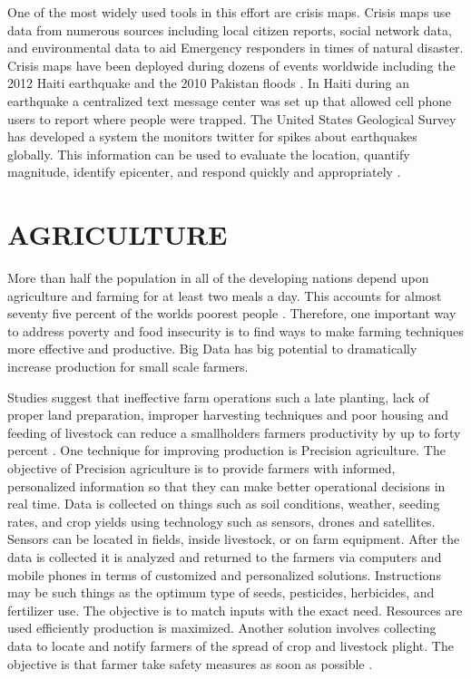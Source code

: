 \documentclass[sigconf]{acmart}
\begin{document}
One of the most widely used tools in this effort are crisis maps. Crisis maps use data from numerous sources including local citizen reports, social network data, and environmental data to aid Emergency responders in times of natural disaster. Crisis maps have been deployed during dozens of events worldwide including the 2012 Haiti earthquake and the 2010 Pakistan floods \cite{www-google-Hffpst}.
In Haiti during an earthquake a centralized text message center was set up that allowed cell phone users to report where people were trapped. The United States Geological Survey has developed a system the monitors twitter for spikes about earthquakes globally. This information can be used to evaluate the location, quantify magnitude, identify epicenter, and respond quickly and appropriately \cite{www-google-GloPls}.

\section{AGRICULTURE}

More than half the population in all of the developing nations depend upon agriculture and farming for at least two meals a day. This accounts for almost seventy five percent of the worlds poorest people \cite{www-google-top10}.  Therefore, one important way to address poverty and food insecurity is to find ways to make farming techniques more effective and productive. Big Data has big potential to dramatically increase production for small scale farmers.

Studies suggest that ineffective farm operations such a late planting, lack of proper land preparation, improper harvesting techniques and poor housing and feeding of livestock can reduce a smallholders farmers productivity by up to forty percent \cite{DevEcon}.
One technique for improving production is Precision agriculture. The objective of Precision agriculture is to provide farmers with informed, personalized information so that they can make better operational decisions in real time. Data is collected on things such as soil conditions, weather, seeding rates, and crop yields using technology such as sensors, drones and satellites. Sensors can be located in fields, inside livestock, or on farm equipment.  After the data is collected it is analyzed and returned to the farmers via computers and mobile phones in terms of customized and personalized solutions. Instructions may be such things as the optimum type of seeds, pesticides, herbicides, and fertilizer use. The objective is to match inputs with the exact need. Resources are used efficiently production is maximized. Another solution involves collecting data to locate and notify farmers of the spread of crop and livestock plight. The objective is that farmer take safety measures as soon as possible \cite{www-google-Hffpst}.
\end{document}
